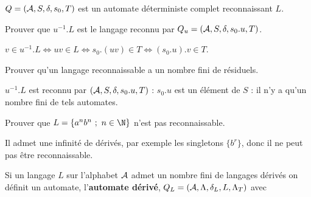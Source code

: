 $Q=({\cal A},S,\delta,s_0,T)$ est un automate déterministe complet reconnaissant $L$.
\begin{Exercise}[title = Reconnaissabilité des dérivés]

Prouver que $u^{-1}.L$ est le langage reconnu par $Q_u=({\cal A},S,\delta,s_0.u,T)$.
\end{Exercise}
\begin{Answer}
$ v \in u^{-1}.L \iff uv \in L \iff s_0.(uv) \in T \iff (s_0.u).v\in T$.
\end{Answer}
\begin{Exercise}[title = {Critère de reconnaissabilité}, label = exo:fini]

Prouver qu'un langage reconnaissable a un nombre fini de résiduels.
\end{Exercise}
\begin{Answer}
$u^{-1}.L$ est reconnu par $({\cal A},S,\delta,s_0.u,T)$ : $s_0.u$ est un élément de $S$ : il n'y a qu'un nombre fini de tels automates.
\end{Answer}
\begin{Exercise}[title = Un langage non reconnaissable]

Prouver que $L=\{a^nb^n\ ;\ n\in\N\}$ n'est pas reconnaissable.
\end{Exercise}
\begin{Answer}
Il admet une infinité de dérivés, par exemple les singletons $\{b^r\}$, donc il ne peut pas être reconnaissable.
\end{Answer}
\bigskip

Si un langage $L$ sur l'alphabet ${\cal A}$ admet un nombre fini de langages dérivés on définit un automate, l'{\bf automate dérivé}, $Q_L=({\cal A},\Lambda,\delta_L,L,\Lambda_T)$ avec


